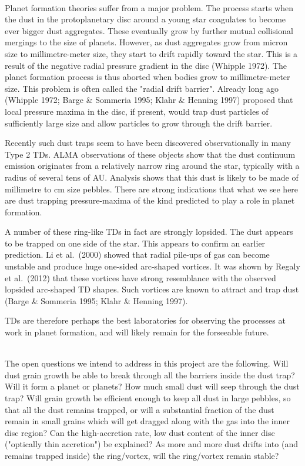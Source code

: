 \vspace{0.5em}
\\
Planet formation theories suffer from a major problem. The process starts
when the dust in the protoplanetary disc around a young star coagulates to
become ever bigger dust aggregates. These eventually grow by further mutual
collisional mergings to the size of planets. However, as dust aggregates
grow from micron size to millimetre-meter size, they start to drift rapidly
toward the star. This is a result of the negative radial pressure gradient
in the disc (Whipple 1972).
The planet formation process is thus aborted when bodies grow to
millimetre-meter size. This problem is often called the "radial drift
barrier". Already long ago (Whipple 1972; Barge \& Sommeria 1995;
Klahr \& Henning 1997)
proposed that local pressure maxima in the disc, if present, would trap dust
particles of sufficiently large size and allow particles to grow through the
drift barrier. 

Recently such dust traps seem to have been discovered observationally in
many Type 2 TDs. ALMA observations of these objects show that
the dust continuum emission originates from a relatively narrow ring around
the star, typically with a radius of several tens of AU. Analysis shows that
this dust is likely to be made of millimetre to cm size pebbles. There are
strong indications that what we see here are dust trapping pressure-maxima
of the kind predicted to play a role in planet formation. 

A number of these ring-like TDs in fact are strongly lopsided.
The dust appears to be trapped on one side of the star. This appears to
confirm an earlier prediction. Li et al.~(2000)
showed that radial pile-ups of gas can become unstable and produce huge
one-sided arc-shaped vortices.  It was shown by Regaly et al.~(2012)
that these vortices have strong resemblance with the observed
lopsided arc-shaped TD shapes.  Such vortices are known to
attract and trap dust (Barge \& Sommeria 1995; Klahr \& Henning 1997).

TDs are therefore perhaps the best laboratories for observing
the processes at work in planet formation, and will likely remain for the
forseeable future.

\vspace{0.5em}
\\
The open questions we intend to address in this project are the following.
Will dust grain growth be able to break through all the barriers inside the
dust trap? Will it form a planet or planets? How much small dust will seep
through the dust trap? Will grain growth be efficient enough to keep all
dust in large pebbles, so that all the dust remains trapped, or will a
substantial fraction of the dust remain in small grains which will get
dragged along with the gas into the inner disc region? Can the
high-accretion rate, low dust content of the inner disc ("optically thin
accretion") be explained?  As more and more dust drifts into (and remains
trapped inside) the ring/vortex, will the ring/vortex remain stable?


